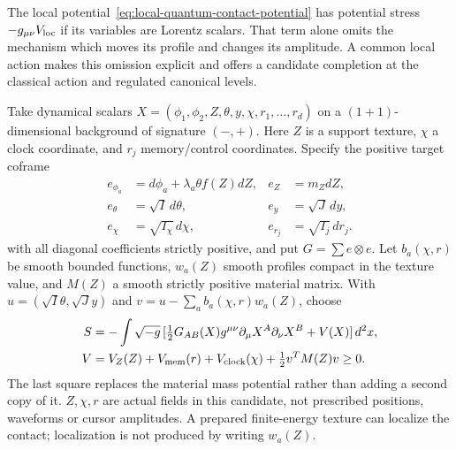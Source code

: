 The local potential~\eqref{eq:local-quantum-contact-potential}
has potential stress $-g_{\mu\nu}V_{\rm loc}$ if its variables are
Lorentz scalars. That term alone omits the mechanism which moves its
profile and changes its amplitude. A common local action makes this
omission explicit and offers a candidate completion at the classical
action and regulated canonical levels.

Take dynamical scalars
$X=(\phi_1,\phi_2,Z,\theta,y,\chi,r_1,\ldots,r_d)$ on a
$(1+1)$-dimensional background of signature $(-,+)$.
Here $Z$ is a support texture, $\chi$ a clock coordinate, and $r_j$
memory/control coordinates. Specify the positive target coframe
\begin{align*}
 e_{\phi_a}&=d\phi_a+\lambda_a\theta f(Z)dZ,& e_Z&=m_ZdZ,\\
 e_\theta&=\sqrt I\,d\theta,&e_y&=\sqrt J\,dy,\\
 e_\chi&=\sqrt{I_\chi}\,d\chi,&e_{r_j}&=\sqrt{I_j}\,dr_j .
\end{align*}
with all diagonal coefficients strictly positive, and put
$G=\sum e\otimes e$. Let $b_a(\chi,r)$ be smooth bounded functions,
$w_a(Z)$ smooth profiles compact in the texture value, and
$M(Z)$ a smooth strictly positive material matrix. With
$u=(\sqrt I\theta,\sqrt Jy)$ and
$v=u-\sum_a b_a(\chi,r)w_a(Z)$, choose
\begin{align}
 S&=-\int\sqrt{-g}\,[\tfrac12G_{AB}(X)
       g^{\mu\nu}\partial_\mu X^A\partial_\nu X^B+V(X)]\,d^2x,
       \label{eq:common-material-action}\\
 V&=V_Z(Z)+V_{\rm mem}(r)+V_{\rm clock}(\chi)
                        +\tfrac12v^TM(Z)v\ge0 .
       \label{eq:common-material-potential}
\end{align}
The last square replaces the material mass potential rather than
adding a second copy of it. $Z,\chi,r$ are actual fields in this
candidate, not prescribed positions, waveforms or cursor amplitudes.
A prepared finite-energy texture can localize the contact; localization
is not produced by writing $w_a(Z)$.

